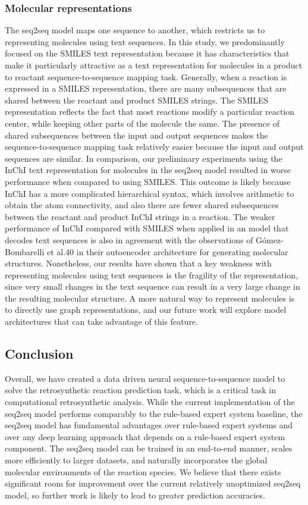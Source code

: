\subsubsection{Molecular representations}

The seq2seq model maps one sequence to another, which restricts us to representing molecules using text sequences. In this study, we predominantly focused on the SMILES text representation because it has characteristics that make it particularly attractive as a text representation for molecules in a product to reactant sequence-to-sequence mapping task. Generally, when a reaction is expressed in a SMILES representation, there are many subsequences that are shared between the reactant and product SMILES strings. The SMILES representation reflects the fact that most reactions modify a particular reaction center, while keeping other parts of the molecule the same. The presence of shared subsequences between the input and output sequences makes the sequence-to-sequence mapping task relatively easier because the input and output sequences are similar. In comparison, our preliminary experiments using the InChI text representation for molecules in the seq2seq model resulted in worse performance when compared to using SMILES. This outcome is likely because InChI has a more complicated hierarchical syntax, which involves arithmetic to obtain the atom connectivity, and also there are fewer shared subsequences between the reactant and product InChI strings in a reaction. The weaker performance of InChI compared with SMILES when applied in an model that decodes text sequences is also in agreement with the observations of Gómez-Bombarelli et al.40 in their autoencoder architecture for generating molecular structures. Nonetheless, our results have shown that a key weakness with representing molecules using text sequences is the fragility of the representation, since very small changes in the text sequence can result in a very large change in the resulting molecular structure. A more natural way to represent molecules is to directly use graph representations, and our future work will explore model architectures that can take advantage of this feature.

\subsection{Conclusion}

Overall, we have created a data driven neural sequence-to-sequence model to solve the retrosynthetic reaction prediction task, which is a critical task in computational retrosynthetic analysis. While the current implementation of the seq2seq model performs comparably to the rule-based expert system baseline, the seq2seq model has fundamental advantages over rule-based expert systems and over any deep learning approach that depends on a rule-based expert system component. The seq2seq model can be trained in an end-to-end manner, scales more efficiently to larger datasets, and naturally incorporates the global molecular environments of the reaction species. We believe that there exists significant room for improvement over the current relatively unoptimized seq2seq model, so further work is likely to lead to greater prediction accuracies. 

